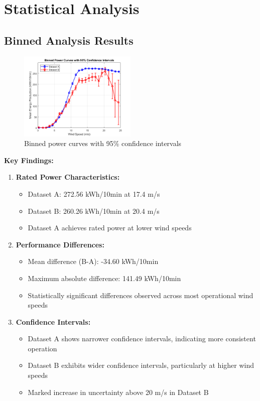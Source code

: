 \documentclass[a4paper,11pt]{article}
\begin{document}
\section{Statistical Analysis}

\subsection{Binned Analysis Results}
\begin{figure}[H]
    \centering
    \includegraphics[width=0.5\textwidth]{Figure2_BinnedAnalysis.png}
    \caption{Binned power curves with 95\% confidence intervals}
    \label{fig:binned}
\end{figure}

\textbf{Key Findings:}
\begin{enumerate}
    \item \textbf{Rated Power Characteristics:}
    \begin{itemize}
        \item Dataset A: 272.56 \si{kWh/10min} at 17.4 \si{m/s}
        \item Dataset B: 260.26 \si{kWh/10min} at 20.4 \si{m/s}
        \item Dataset A achieves rated power at lower wind speeds
    \end{itemize}

    \item \textbf{Performance Differences:}
    \begin{itemize}
        \item Mean difference (B-A): -34.60 \si{kWh/10min}
        \item Maximum absolute difference: 141.49 \si{kWh/10min}
        \item Statistically significant differences observed across most operational wind speeds
    \end{itemize}

    \item \textbf{Confidence Intervals:}
    \begin{itemize}
        \item Dataset A shows narrower confidence intervals, indicating more consistent operation
        \item Dataset B exhibits wider confidence intervals, particularly at higher wind speeds
        \item Marked increase in uncertainty above 20 \si{m/s} in Dataset B
    \end{itemize}
\end{enumerate}
\end{document}
